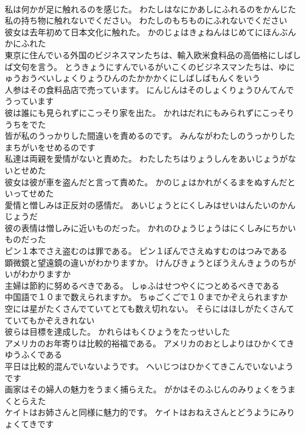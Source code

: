 \documentclass[8pt]{extreport}
\begin{document}
\begin{CJK}{UTF8}{min}
\\	私は何かが足に触れるのを感じた。	わたしはなにかあしにふれるのをかんじた 
\\	私の持ち物に触れないでください。	わたしのもちものにふれないでください 
\\	彼女は去年初めて日本文化に触れた。	かのじょはきょねんはじめてにほんぶんかにふれた 
\\	東京に住んでいる外国のビジネスマンたちは、輸入欧米食料品の高価格にしばしば文句を言う。	とうきょうにすんでいるがいこくのビジネスマンたちは、ゆにゅうおうべいしょくりょうひんのたかかかくにしばしばもんくをいう 
\\	人参はその食料品店で売っています。	にんじんはそのしょくりょうひんてんでうっています 
\\	彼は誰にも見られずにこっそり家を出た。	かれはだれにもみられずにこっそりうちをでた 
\\	皆が私のうっかりした間違いを責めるのです。	みんながわたしのうっかりしたまちがいをせめるのです 
\\	私達は両親を愛情がないと責めた。	わたしたちはりょうしんをあいじょうがないとせめた 
\\	彼女は彼が車を盗んだと言って責めた。	かのじょはかれがくるまをぬすんだといってせめた 
\\	愛情と憎しみは正反対の感情だ。	あいじょうとにくしみはせいはんたいのかんじょうだ 
\\	彼の表情は憎しみに近いものだった。	かれのひょうじょうはにくしみにちかいものだった 
\\	ピン１本でさえ盗むのは罪である。	ピン１ぽんでさえぬすむのはつみである 
\\	顕微鏡と望遠鏡の違いがわかりますか。	けんびきょうとぼうえんきょうのちがいがわかりますか 
\\	主婦は節約に努めるべきである。	しゅふはせつやくにつとめるべきである 
\\	中国語で１０まで数えられますか。	ちゅごくごで１０までかぞえられますか 
\\	空には星がたくさんでていてとても数え切れない。	そらにはほしがたくさんてていてもかぞえきれない 
\\	彼らは目標を達成した。	かれらはもくひょうをたっせいした 
\\	アメリカのお年寄りは比較的裕福である。	アメリカのおとしよりはひかくてきゆうふくである 
\\	平日は比較的混んでいないようです。	へいじつはひかくてきこんでいないようです 
\\	画家はその婦人の魅力をうまく捕らえた。	がかはそのふじんのみりょくをうまくとらえた 
\\	ケイトはお姉さんと同様に魅力的です。	ケイトはおねえさんとどうようにみりょくてきです 

\end{CJK}
\end{document}
